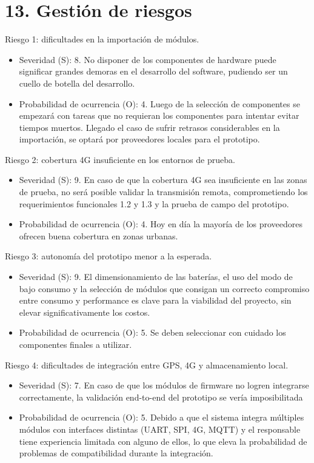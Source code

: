 \documentclass[
11pt, %
]{charter}
\begin{document}
\section{13. Gestión de riesgos}
\label{sec:riesgos}

Riesgo 1: dificultades en la importación de módulos.
\begin{itemize}
	\item Severidad (S): 8. No disponer de los componentes de hardware puede significar grandes demoras en el desarrollo del software, pudiendo ser un cuello de botella del desarrollo.
	\item Probabilidad de ocurrencia (O): 4. Luego de la selección de componentes se empezará con tareas que no requieran los componentes para intentar evitar tiempos muertos. Llegado el caso de sufrir retrasos considerables en la importación, se optará por proveedores locales para el prototipo.
\end{itemize}

Riesgo 2: cobertura 4G insuficiente en los entornos de prueba.
\begin{itemize}
	\item Severidad (S): 9.  En caso de que la cobertura 4G sea insuficiente en las zonas de prueba, no será posible validar la transmisión remota, comprometiendo los requerimientos funcionales 1.2 y 1.3 y la prueba de campo del prototipo.	
	\item Probabilidad de ocurrencia (O): 4. Hoy en día la mayoría de los proveedores ofrecen buena cobertura en zonas urbanas.
\end{itemize}

Riesgo 3: autonomía del prototipo menor a la esperada.
\begin{itemize}
	\item Severidad (S): 9. El dimensionamiento de las baterías, el uso del modo de bajo consumo y la selección de módulos que consigan un correcto compromiso entre consumo y performance es clave para la viabilidad del proyecto, sin elevar significativamente los costos.
	\item Probabilidad de ocurrencia (O): 5. Se deben seleccionar con cuidado los componentes finales a utilizar.
\end{itemize}

Riesgo 4: dificultades de integración entre GPS, 4G y almacenamiento local.
\begin{itemize}
	\item Severidad (S): 7. En caso de que los módulos de firmware no logren integrarse correctamente, la validación end-to-end del prototipo se vería imposibilitada
	\item Probabilidad de ocurrencia (O): 5. Debido a que el sistema integra múltiples módulos con interfaces distintas (UART, SPI, 4G, MQTT) y el responsable tiene experiencia limitada con alguno de ellos, lo que eleva la probabilidad de problemas de compatibilidad durante la integración.
\end{itemize}
\end{document}
